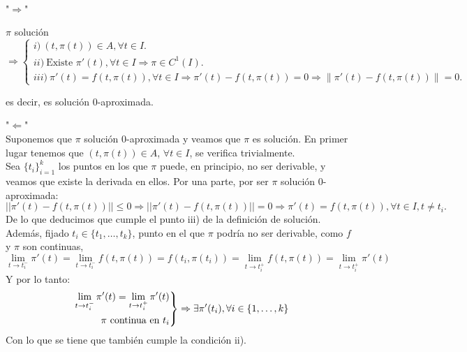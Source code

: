 \documentclass{article}
\makeatletter
\newenvironment{rcases}
{\left.\begin{aligned}}
	{\end{aligned}\right\rbrace}
\providecommand{\norm}[1]{\lVert#1\rVert}
\theoremstyle{theorem-style}  %
\theoremstyle{definition-style}
\theoremstyle{example-style}
\renewenvironment{proof}[1][\proofname]{\par
	\pushQED{\qed}%
	\normalfont \topsep6\p@\@plus6\p@\relax
	\list{}{%
		\settowidth{\leftmargin}{\quad:\hskip\labelsep}%
		\setlength{\labelwidth}{0pt}%
		\setlength{\itemindent}{-\leftmargin}%
	}%
	\item[\hskip\labelsep\itshape#1\@addpunct{:}]\ignorespaces
}{%
	\popQED\endlist\@endpefalse
}
\makeatother
\begin{document}
\begin{proof}\ \\
	"$ \Rightarrow $"
	
	$ \pi $	solución $\Rightarrow \begin{cases}
	i)\  (t, \pi (t)) \in A, \forall t \in I.\\
	ii)\  \text{Existe }  \pi' (t), \forall t \in I \Rightarrow \pi \in C^1(I). \\
	iii)\  \pi'(t)=f(t, \pi(t)),  \forall t \in I \Rightarrow \pi'(t)-f(t, \pi(t))=0 \Rightarrow \norm{\pi'(t)-f(t, \pi(t))}=0.
	\end{cases}$ 
	
	es decir, es solución 0-aproximada.
	
	"$ \Leftarrow $" \\Suponemos que $ \pi $ solución 0-aproximada y veamos que $ \pi $ es solución. En primer lugar tenemos que $(t, \pi (t)) \in A$, $\forall t \in I$, se verifica trivialmente. \\
	Sea $ \{t_i\}_{i=1}^k $ los puntos en los que $ \pi $ puede, en principio, no ser derivable, y veamos que existe la derivada en ellos. Por una parte, por ser  $ \pi $ solución 0-aproximada:
	 \[ ||\pi'(t)-f(t,\pi(t))||\leq 0\Rightarrow ||\pi'(t)-f(t,\pi(t))||=0 \Rightarrow \pi'(t)=f(t, \pi(t)), \forall t \in I, t\neq t_i.\]
	De lo que deducimos que cumple el punto iii) de la definición de solución. Además, fijado $ t_i\in \{t_1, \dots, t_k\} $, punto en el que $ \pi $ podría no ser derivable, como $ f $ y $ \pi $ son continuas, 
	\[ \lim\limits_{t\rightarrow t_i^-}\pi'(t)=\lim\limits_{t\rightarrow t_i^-} f(t, \pi(t))= f(t_i, \pi(t_i))= \lim\limits_{t\rightarrow t_i^+} f(t, \pi(t))=\lim\limits_{t\rightarrow t_i^+}\pi'(t)\]
	Y por lo tanto:
	\[ \begin{rcases}
	\lim\limits_{t\rightarrow t_i^-}\pi'(t)=\lim\limits_{t\rightarrow t_i^+}\pi'(t) \\
	\pi \text{ continua en } t_i
	\end{rcases}\Rightarrow \exists \pi'(t_i), \forall i \in \{1,\dots,k \} \]
	Con lo que se tiene que también cumple la condición ii).	
\end{proof}
\end{document}
